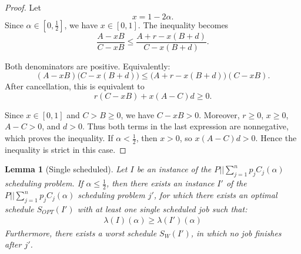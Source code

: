 \documentclass[11pt]{article}
\newtheorem{lemma}{Lemma}
\begin{document}
\begin{proof}
    
Let
\[
x=1-2\alpha.
\]
Since \(\alpha\in[0,\frac12]\), we have \(x\in[0,1]\). The inequality becomes
\[
\frac{A-xB}{C-xB}
\le
\frac{A+r-x(B+d)}{C-x(B+d)}.
\]

Both denominators are positive. Equivalently:
\[
(A-xB)\bigl(C-x(B+d)\bigr)
\le
\bigl(A+r-x(B+d)\bigr)(C-xB).
\]
After cancellation, this is equivalent to
\[
r(C-xB)+x(A-C)d\ge 0.
\]

Since \(x\in[0,1]\) and \(C>B\geq0\), we have \(C-xB>0\).
Moreover, \(r\geq0\), \(x\geq0\), \(A-C>0\), and \(d>0\).
Thus both terms in the last expression are nonnegative, which proves the
inequality.
If \(\alpha<\frac12\), then \(x>0\), so
\(x(A-C)d>0\). Hence the inequality is strict in this case.
\end{proof}

\begin{lemma}[Single scheduled]
Let $I$ be an instance of the $P||\sum_{j=1}^{n}{p_j C_j}(\alpha)$ scheduling problem.
If $\alpha \leq \frac{1}{2}$, then there exists an instance $I'$ of the $P||\sum_{j=1}^{n}{p_j C_j}(\alpha)$ 
scheduling problem $j'$, for which there exists an optimal schedule $S_{OPT}(I')$ with
at least one single scheduled job such that: 
\begin{align*}
   \lambda(I)(\alpha) \geq \lambda(I')(\alpha) 
\end{align*} 
Furthermore, there exists a worst schedule $S_{W}(I')$, in which no job finishes after $j'$. 
\end{lemma}
\end{document}
